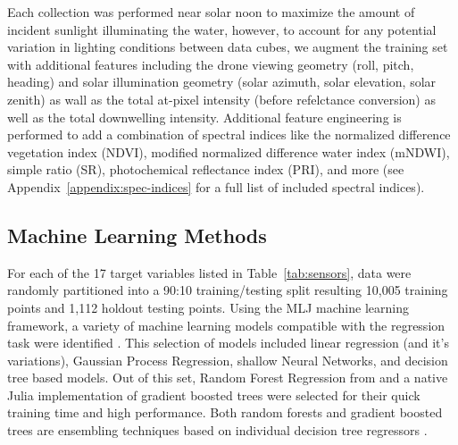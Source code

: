 \documentclass[journal,article,submit,pdftex,moreauthors]{Definitions/mdpi}
\begin{document}
Each collection was performed near solar noon to maximize the amount of incident sunlight illuminating the water, however, to account for any potential variation in lighting conditions between data cubes, we augment the training set with additional features including the drone viewing geometry (roll, pitch, heading) and solar illumination geometry (solar azimuth, solar elevation, solar zenith) as wall as the total at-pixel intensity (before refelctance conversion) as well as the total downwelling intensity. Additional feature engineering is performed to add a combination of spectral indices like the normalized difference vegetation index (NDVI), modified normalized difference water index (mNDWI), simple ratio (SR), photochemical reflectance index (PRI), and more (see Appendix~\ref{appendix:spec-indices} for a full list of included spectral indices). 

\subsection{Machine Learning Methods}

For each of the 17 target variables listed in Table~\ref{tab:sensors}, data were randomly partitioned into a 90:10 training/testing split resulting 10,005 training points and 1,112 holdout testing points. Using the MLJ machine learning framework, a variety of machine learning models compatible with the regression task were identified \cite{MLJ1}. This selection of models included linear regression (and it's variations), Gaussian Process Regression, shallow Neural Networks, and decision tree based models. Out of this set, Random Forest Regression from \cite{decision-trees} and a native Julia implementation of gradient boosted trees were selected for their quick training time and high performance. Both random forests and gradient boosted trees are ensembling techniques based on individual decision tree regressors \cite{decision-trees, random-forest, gradient-boosting}. 
\end{document}
